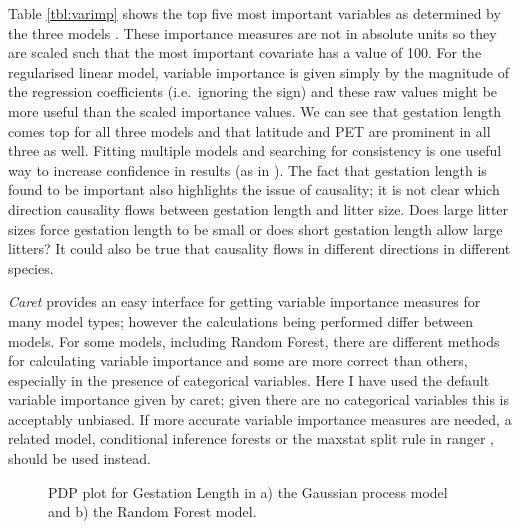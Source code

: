 \documentclass[10pt,]{article}
\begin{document}
Table \ref{tbl:varimp} shows the top five most important variables as determined by the three models \citep{oppel2009alternative}.
These importance measures are not in absolute units so they are scaled such that the most important covariate has a value of 100.
For the regularised linear model, variable importance is given simply by the magnitude of the regression coefficients (i.e.~ignoring the sign) and these raw values might be more useful than the scaled importance values.
We can see that gestation length comes top for all three models and that latitude and PET are prominent in all three as well.
Fitting multiple models and searching for consistency is one useful way to increase confidence in results (as in \citet{appelhans2015evaluating}).
The fact that gestation length is found to be important also highlights the issue of causality; it is not clear which direction causality flows between gestation length and litter size.
Does large litter sizes force gestation length to be small or does short gestation length allow large litters? 
It could also be true that causality flows in different directions in different species.

\emph{Caret} provides an easy interface for getting variable importance measures for many model types; however the calculations being performed differ between models.
For some models, including Random Forest, there are different methods for calculating variable importance \citep{oppel2009alternative, seifert2019surrogate} and some are more correct than others, especially in the presence of categorical variables.
Here I have used the default variable importance given by caret; given there are no categorical variables this is acceptably unbiased.
If more accurate variable importance measures are needed, a related model, conditional inference forests \citep{hothorn2006unbiased} or the maxstat split rule in ranger \citep{wright2017unbiased}, should be used instead.


\begin{figure}[t!]
  \centering

  \label{fig:pdp}
  \caption{
    PDP plot for Gestation Length in a) the Gaussian process model and b) the Random Forest model.
  }
\end{figure}
\end{document}
